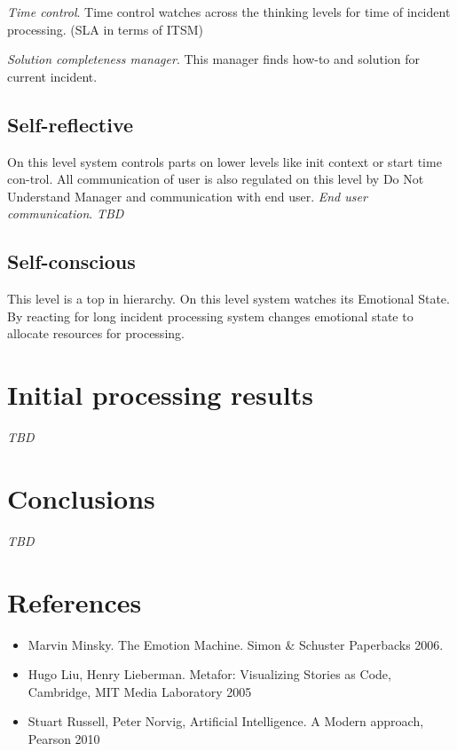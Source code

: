 \documentclass[12pt]{article}
\begin{document}
\emph{Time control}. Time control watches across the thinking levels for time of incident processing. (SLA  in terms of ITSM)

\emph{Solution completeness manager}. This manager finds how-to and solution for current incident.

\subsection{Self-reflective}
On this level system controls parts on lower levels like init context or start time con-trol. All communication of user is also regulated on this level by Do Not Understand Manager and communication with end user.
\emph{End user communication}. \emph{TBD}

\subsection{Self-conscious}
This level is a top in hierarchy. On this level system watches its Emotional State. By reacting for long incident processing system changes emotional state to allocate resources for processing.

\section{Initial processing results}

\emph{TBD}

\section{Conclusions}

\emph{TBD}

\section{References}

\begin{itemize}
 \item Marvin Minsky. The Emotion Machine. Simon \& Schuster Paperbacks 2006.
 \item Hugo Liu, Henry Lieberman. Metafor: Visualizing Stories as Code, Cambridge, MIT Media Laboratory 2005
 \item Stuart Russell, Peter Norvig, Artificial Intelligence. A Modern approach, Pearson 2010
\end{itemize}
\end{document}
